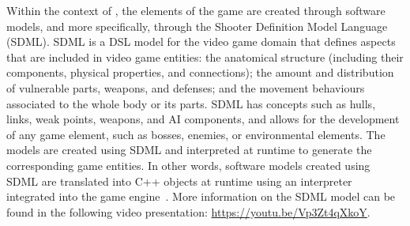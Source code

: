 Within the context of \CaseStudy{}, the elements of the game are created through software models, and more specifically, through the Shooter Definition Model Language (SDML). SDML is a DSL model for the video game domain that defines aspects that are included in video game entities: the anatomical structure (including their components, physical properties, and connections); the amount and distribution of vulnerable parts, weapons, and defenses; and the movement behaviours associated to the whole body or its parts. SDML has concepts such as hulls, links, weak points, weapons, and AI components, and allows for the development of any game element, such as bosses, enemies, or environmental elements. The models are created using SDML and interpreted at runtime to generate the corresponding game entities. In other words, software models created using SDML are translated into C++ objects at runtime using an interpreter integrated into the game engine~\cite{blasco2021evolutionary}. More information on the SDML model can be found in the following video presentation: \url{https://youtu.be/Vp3Zt4qXkoY}.

